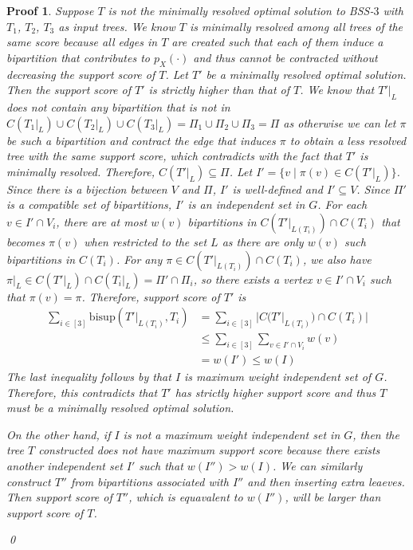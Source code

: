 \documentclass[twocolumn]{bmcart}%
\newcommand{\bs}{\mathrm{bisup}}
\newcommand{\bssthree}{\textsc{BSS-$3$}\xspace}
\theoremstyle{mystyle}
\theoremstyle{proofstyle}
\newtheorem*{proof2}{Proof}
\newenvironment{proofnospace}{\begin{proof2}}{\qed \end{proof2}}
\begin{document}
\begin{proofnospace}
  Suppose $T$ is not the minimally resolved optimal solution to \bssthree with $T_1$, $T_2$, $T_3$ as input trees. We know $T$ is minimally resolved among all trees of the same score because all edges in $T$ are created such that each of them induce a bipartition that contributes to $p_X(\cdot)$ and thus cannot be contracted without decreasing the support score of $T$. Let $T'$ be a minimally resolved optimal solution. Then the support score of $T'$ is strictly higher than that of $T$. We know that $T'|_L$ does not contain any bipartition that is not in $C(T_1|_L) \cup C(T_2|_L) \cup C(T_3|_L) = \Pi_1 \cup \Pi_2 \cup \Pi_3 = \Pi$ as otherwise we can let $\pi$ be such a bipartition and contract the edge that induces $\pi$ to obtain a less resolved tree with the same support score, which contradicts with the fact that $T'$ is minimally resolved. Therefore, $C(T'|_L) \subseteq \Pi$. Let $I' = \{v \mid \pi(v) \in C(T'|_L)\}$. Since there is a bijection between $V$ and $\Pi$, $I'$ is well-defined and $I' \subseteq V$. Since $\Pi'$ is a compatible set of bipartitions, $I'$ is an independent set in $G$. For each $v \in I'\cap V_i$, there are at most $w(v)$ bipartitions in $C(T'|_{L(T_i)}) \cap C(T_i)$ that becomes $\pi(v)$ when restricted to the set $L$ as there are only $w(v)$ such bipartitions in $C(T_i)$. For any $\pi \in C(T'|_{L(T_i)}) \cap C(T_i)$, we also have $\pi|_L \in C(T'|_L) \cap C(T_i|_L) = \Pi' \cap \Pi_i$, so there exists a vertex $v \in I' \cap V_i$ such that $\pi(v) = \pi$. Therefore, support score of $T'$ is 
  \begin{align*}
    \sum_{i \in [3]} \bs(T'|_{L(T_i)}, T_i) &= \sum_{i \in [3]} |C(T'|_{L(T_i)}) \cap C(T_i)|\\
    &\le \sum_{i \in [3]} \sum_{v \in I' \cap V_i} w(v) \\
    &= w(I') \le w(I) 
  \end{align*}
  The last inequality follows by that $I$ is maximum weight independent set of $G$. Therefore, this contradicts that $T'$ has strictly higher support score and thus $T$ must be a minimally resolved optimal solution. 

  On the other hand, if $I$ is not a maximum weight independent set in $G$, then the tree $T$ constructed does not have maximum support score because there exists another independent set $I'$ such that $w(I'') > w(I)$. We can similarly construct $T''$ from bipartitions associated with $I''$ and then inserting extra leaeves. Then support score of $T''$, which is equavalent to $w(I'')$, will be larger than support score of $T$. 
  

\end{proofnospace}
\end{document}
